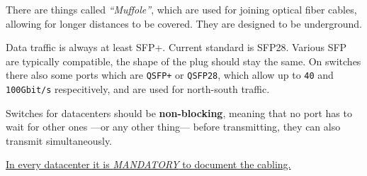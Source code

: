 There are things called \textit{``Muffole''}, which are used for joining optical fiber cables, allowing for longer distances to be covered.
They are designed to be underground.

Data traffic is always at least SFP+.
Current standard is SFP28. Various SFP are typically compatible, the shape of the plug should stay the same.
On switches there also some ports which are \texttt{QSFP+} or \texttt{QSFP28}, which allow up to \texttt{40} and \texttt{100Gbit/s} respecitively, and are used for north-south traffic.

Switches for datacenters should be \textbf{non-blocking}, meaning that no port has to wait for other ones ---or any other thing--- before transmitting, they can also transmit simultaneously.


\ul{In every datacenter it is \textit{MANDATORY} to document the cabling.}
